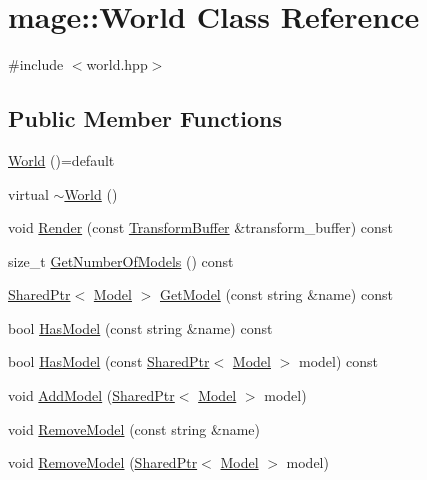 \hypertarget{classmage_1_1_world}{}\section{mage\+:\+:World Class Reference}
\label{classmage_1_1_world}


{\ttfamily \#include $<$world.\+hpp$>$}

\subsection*{Public Member Functions}
\begin{DoxyCompactItemize}
\item 
\hyperlink{classmage_1_1_world_a80582236a880812f9795a28ae5523cf7}{World} ()=default
\item 
virtual \hyperlink{classmage_1_1_world_aa51807f68564554dcc2e5f4527e0a620}{$\sim$\+World} ()
\item 
void \hyperlink{classmage_1_1_world_a33da6ffdf89b78602e150101a9a38205}{Render} (const \hyperlink{structmage_1_1_transform_buffer}{Transform\+Buffer} \&transform\+\_\+buffer) const
\item 
size\+\_\+t \hyperlink{classmage_1_1_world_a6e04fdde74a2616746cdafd12537c4a7}{Get\+Number\+Of\+Models} () const
\item 
\hyperlink{namespacemage_a1e01ae66713838a7a67d30e44c67703e}{Shared\+Ptr}$<$ \hyperlink{classmage_1_1_model}{Model} $>$ \hyperlink{classmage_1_1_world_ac91abee028df87d8879332e0df3d9e8a}{Get\+Model} (const string \&name) const
\item 
bool \hyperlink{classmage_1_1_world_a381e0a56fc1ba6d0955a248f7b0f0c22}{Has\+Model} (const string \&name) const
\item 
bool \hyperlink{classmage_1_1_world_a821d420241b2a94502b20e24595490df}{Has\+Model} (const \hyperlink{namespacemage_a1e01ae66713838a7a67d30e44c67703e}{Shared\+Ptr}$<$ \hyperlink{classmage_1_1_model}{Model} $>$ model) const
\item 
void \hyperlink{classmage_1_1_world_a4b7287a11ff316b029ec7727ed0d076d}{Add\+Model} (\hyperlink{namespacemage_a1e01ae66713838a7a67d30e44c67703e}{Shared\+Ptr}$<$ \hyperlink{classmage_1_1_model}{Model} $>$ model)
\item 
void \hyperlink{classmage_1_1_world_aebba267c6c47de1c806ffe49be273dea}{Remove\+Model} (const string \&name)
\item 
void \hyperlink{classmage_1_1_world_afad0c7024fcd304bb582bdc1d281c590}{Remove\+Model} (\hyperlink{namespacemage_a1e01ae66713838a7a67d30e44c67703e}{Shared\+Ptr}$<$ \hyperlink{classmage_1_1_model}{Model} $>$ model)

\end{DoxyCompactItemize}
